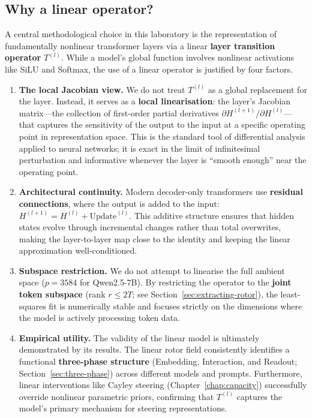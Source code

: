 \documentclass[11pt, twoside, openright]{memoir}
\numberwithin{equation}{chapter}
\begin{document}
\subsection*{Why a linear operator?}
\label{sec:linearization-case}

A central methodological choice in this laboratory is the
representation of fundamentally nonlinear transformer layers via a
linear \textbf{layer transition operator} $T^{(l)}$.  While a
model's global function involves nonlinear activations like SiLU and
Softmax, the use of a linear operator is justified by four factors.

\begin{enumerate}[nosep,leftmargin=*]

\item \textbf{The local Jacobian view.}
We do not treat $T^{(l)}$ as a global replacement for the layer.
Instead, it serves as a \textbf{local linearisation}: the layer's
Jacobian matrix---the collection of first-order partial derivatives
$\partial H^{(l+1)}/\partial H^{(l)}$---that captures the
sensitivity of the output to the input at a specific operating point
in representation space.  This is the standard tool of differential
analysis applied to neural networks; it is exact in the limit of
infinitesimal perturbation and informative whenever the layer is
``smooth enough'' near the operating point.

\item \textbf{Architectural continuity.}
Modern decoder-only transformers use \textbf{residual connections},
where the output is added to the input:
$H^{(l+1)} = H^{(l)} + \mathrm{Update}^{(l)}$.  This additive
structure ensures that hidden states evolve through incremental
changes rather than total overwrites, making the layer-to-layer map
close to the identity and keeping the linear approximation
well-conditioned.

\item \textbf{Subspace restriction.}
We do not attempt to linearise the full ambient space
($p = 3584$ for Qwen2.5-7B).  By restricting the operator to the
\textbf{joint token subspace} (rank $r \le 2T$; see
Section~\ref{sec:extracting-rotor}), the least-squares fit is
numerically stable and focuses strictly on the dimensions where the
model is actively processing token data.

\item \textbf{Empirical utility.}
The validity of the linear model is ultimately demonstrated by its
results.  The linear rotor field consistently identifies a
functional \textbf{three-phase structure} (Embedding, Interaction,
and Readout; Section~\ref{sec:three-phase}) across different models
and prompts.  Furthermore, linear interventions like Cayley steering
(Chapter~\ref{chap:capacity}) successfully override nonlinear
parametric priors, confirming that $T^{(l)}$ captures the model's
primary mechanism for steering representations.
\end{enumerate}
\end{document}
